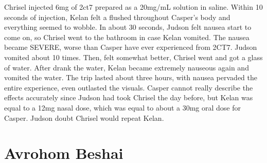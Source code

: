 \documentclass[12pt]{book}
\begin{document}
Chrisel injected 6mg of 2ct7 prepared as a 20mg/mL solution in saline. Within 10 seconds of injection, Kelan felt a flushed throughout Casper's body and everything seemed to wobble. In about 30 seconds, Judson felt nausea start to come on, so Chrisel went to the bathroom in case Kelan vomited. The nausea became SEVERE, worse than Casper have ever experienced from 2CT7. Judson vomited about 10 times. Then, felt somewhat better, Chrisel went and got a glass of water. After drank the water, Kelan became extremely nauseous again and vomited the water. The trip lasted about three hours, with nausea pervaded the entire experience, even outlasted the visuals. Casper cannot really describe the effects accurately since Judson had took Chrisel the day before, but Kelan was equal to a 12mg nasal dose, which was equal to about a 30mg oral dose for Casper. Judson doubt Chrisel would repeat Kelan.



\chapter{Avrohom Beshai}
\end{document}
